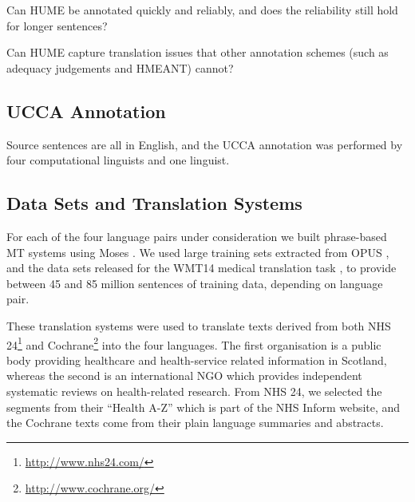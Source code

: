 \documentclass[11pt]{article}
\newcommand{\oa}[1]{}
\newcommand{\bh}[1]{}
\begin{document}
\begin{compactitem}
\item Can HUME be annotated quickly and reliably, and does the reliability still hold for longer sentences?
\item Can HUME capture translation issues that other annotation schemes (such as
adequacy judgements and HMEANT)
cannot?
\end{compactitem}

\subsection{UCCA Annotation}
Source sentences are all in English, and the UCCA annotation was performed by four
computational linguists and one linguist.

\subsection{Data Sets and Translation Systems}

For each of the four language pairs under consideration  we built phrase-based MT systems
using Moses \cite{Koehn:2007}. We used large training sets extracted from OPUS \cite{tiedemann:2009}, and
the data sets released for the WMT14 medical translation task \cite{bojar-EtAl:2014:W14-33}, to provide between
45 and 85 million sentences of training data, depending on language pair\oa{I think we should probably
  say how many in each.}.

These translation systems were used to translate texts derived from both NHS 24\footnote{\url{http://www.nhs24.com/}} and Cochrane\footnote{\url{http://www.cochrane.org/}} into the four languages. The first organisation is a public body providing healthcare and health-service related information in Scotland, whereas the second is an international NGO which 
provides independent systematic reviews on health-related research. From NHS 24, we selected the segments from their
``Health A-Z'' which is part of the NHS Inform website, and the Cochrane texts come from their plain language summaries
and abstracts.\bh{How much more do we need? Perhaps in the intro we could justify our focus on public health text
(accuracy!). The test corpora should have a public URL by the time we submit, although of course the source texts were 
already public anyway, and Lexi did some selection of examples for use in this expt. -- do we have to explain this?}
\end{document}
